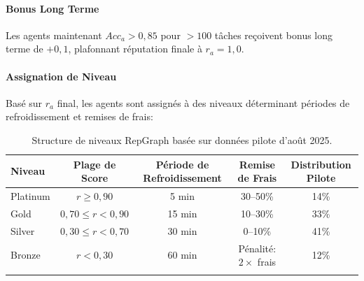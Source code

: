 \documentclass[11pt]{article}
\begin{document}
\paragraph{Bonus Long Terme} Les agents maintenant $Acc_a > 0,85$ pour $>100$ tâches reçoivent bonus long terme de $+0,1$, plafonnant réputation finale à $r_a = 1,0$.

\paragraph{Assignation de Niveau} Basé sur $r_a$ final, les agents sont assignés à des niveaux déterminant périodes de refroidissement et remises de frais:
\begin{longtable}{@{}lcccc@{}}
\toprule
\textbf{Niveau} & \textbf{Plage de Score} & \textbf{Période de Refroidissement} & \textbf{Remise de Frais} & \textbf{Distribution Pilote} \\\midrule
Platinum & $r \geq 0,90$ & 5 min & 30--50\% & 14\% \\
Gold & $0,70 \leq r < 0,90$ & 15 min & 10--30\% & 33\% \\
Silver & $0,30 \leq r < 0,70$ & 30 min & 0--10\% & 41\% \\
Bronze & $r < 0,30$ & 60 min & Pénalité: $2 \times$ frais & 12\% \\\bottomrule
\caption{Structure de niveaux RepGraph basée sur données pilote d'août 2025.}
\label{tab:reputation-tiers}
\end{longtable}
\end{document}
